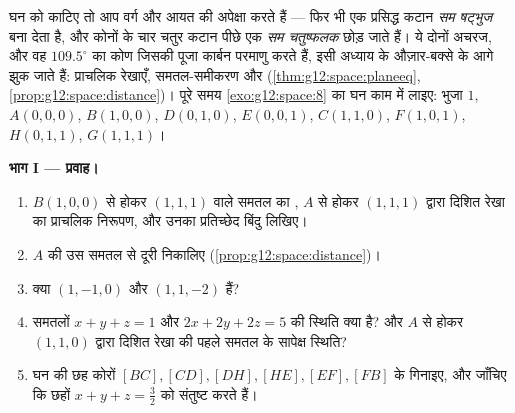 \begin{problem}
\label{pb:g12:space:1}
घन को काटिए तो आप वर्ग और आयत की अपेक्षा करते हैं --- फिर भी एक प्रसिद्ध कटान
\emph{सम षट्भुज} बना देता है, और कोनों के चार चतुर कटान पीछे एक \emph{सम
चतुष्फलक} छोड़ जाते हैं। ये दोनों अचरज, और वह $109.5^\circ$ का कोण जिसकी पूजा कार्बन
परमाणु करते हैं, इसी अध्याय के औज़ार-बक्से के आगे झुक जाते हैं: प्राचलिक
रेखाएँ, समतल-समीकरण और  (\cref{thm:g12:space:planeeq}, \cref{prop:g12:space:distance})। पूरे समय \cref{exo:g12:space:8} का घन काम
में लाइए: भुजा $1$, $A(0,0,0)$, $B(1,0,0)$, $D(0,1,0)$, $E(0,0,1)$, $C(1,1,0)$, $F(1,0,1)$, $H(0,1,1)$, $G(1,1,1)$।

\medskip
\noindent\textbf{भाग I --- प्रवाह।}
\begin{enumerate}
  \item $B(1,0,0)$ से होकर  $(1,1,1)$ वाले समतल का , $A$ से होकर
        $(1,1,1)$ द्वारा दिशित रेखा का प्राचलिक निरूपण, और उनका प्रतिच्छेद बिंदु
        लिखिए।
  \item $A$ की उस समतल से दूरी निकालिए (\cref{prop:g12:space:distance})।
  \item क्या  $(1,-1,0)$ और $(1,1,-2)$  हैं?
  \item समतलों $x + y + z = 1$ और $2x + 2y + 2z = 5$ की स्थिति क्या है? और $A$ से होकर $(1,1,0)$
        द्वारा दिशित रेखा की पहले समतल के सापेक्ष स्थिति?
  \item घन की छह कोरों $[BC], [CD], [DH], [HE], [EF], [FB]$ के  गिनाइए, और जाँचिए कि छहों 
        $x + y + z = \frac32$ को संतुष्ट करते हैं।
\end{enumerate}


\end{problem}
